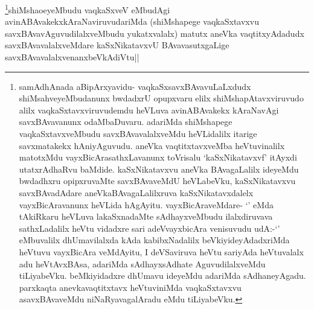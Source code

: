 \begin{artha}
\footnote{samAdhAnada aBipArxyavidu- vaqkaSxsavxBAvavuLaLxdudx shiMsahveyeMbudanunx bwdadxrU opupxvaru elilx shiMshapAtavxviruvudo alilx vaqkaSxtavxviruvudemdu heVLuva avinABAvakekx kAraNavAgi savxBAvavanunx odaMbaDuvaru. adariMda shiMshapege vaqkaSxtavxveMbudu savxBAvavalalxveMdu heVLidalilx itarige savxmatakekx hAniyAguvudu. aneVka vaqtitxtavxveMba heVtuvinalilx matotxMdu vayxBicArasathxLavanunx toVrisalu `kaSxNikatavxvf' itAyxdi utatxrAdhaRvu baMdide. kaSxNikatavxvu aneVka BAvagaLalilx ideyeMdu bwdadhxru opipxruvaMte savxBAvaveMdU heVLabeVku, kaSxNikatavxvu savxBAvadAdare aneVkaBAvagaLalilxruva kaSxNikatavxdalelx vayxBicAravanunx heVLida hAgAyitu. vayxBicAraveMdare- `\stext' eMda tAkiRkaru heVLuva lakaSxnadaMte sAdhayxveMbudu ilalxdiruvava sathxLadalilx heVtu vidadxre sari adeVvayxbicAra venisuvudu udA:-`\stext' eMbuvalilx dhUmavilalxda kAda kabibxNadalilx beVkiyideyAdadxriMda heVtuvu vayxBicAra veMdAyitu, I deVSaviruva heVtu sariyAda heVtuvalalx adu heVtAvxBAsa, adariMda sAdhayxsAdhate AguvudilalxveMdu tiLiyabeVku. beMkiyidadxre dhUmavu ideyeMdu adariMda sAdhaneyAgadu. parxkaqta anevkavaqtitxtavx heVtuviniMda vaqkaSxtavxvu asavxBAvaveMdu niNaRyavagalAradu eMdu tiLiyabeVku.}shiMshaoeyeMbudu vaqkaSxveV eMbudAgi avinABAvakekxkAraNaviruvudariMda (shiMshapege vaqkaSxtavxvu savxBAvavAguvudilalxveMbudu yukatxvalalx) matutx aneVka vaqtitxyAdadudx savxBAvavalalxveMdare kaSxNikatavxvU BAvavasutxgaLige savxBAvavalalxvenanxbeVkAdiVtu||
\end{artha}




